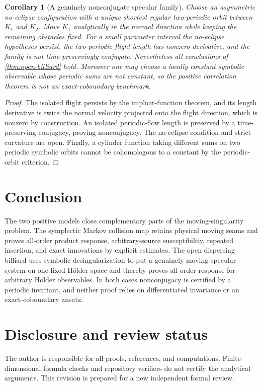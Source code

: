 \documentclass[11pt,reqno]{amsart}
\newtheorem{corollary}[theorem]{Corollary}
\theoremstyle{definition}
\theoremstyle{remark}
\begin{document}
\begin{corollary}[A genuinely nonconjugate specular family]\label{cor:specular}
Choose an asymmetric no-eclipse configuration with a unique shortest regular
two-periodic orbit between $K_1$ and $K_2$.  Move $K_1$ analytically in the
normal direction while keeping the remaining obstacles fixed.  For a small
parameter interval the no-eclipse hypotheses persist, the two-periodic flight
length has nonzero derivative, and the family is not time-preservingly
conjugate.  Nevertheless all conclusions of \cref{thm:open-billiard} hold.
Moreover one may choose a locally constant symbolic observable whose periodic
sums are not constant, so the positive correlation theorem is not an
exact-coboundary benchmark.
\end{corollary}

\begin{proof}
The isolated flight persists by the implicit-function theorem, and its length
derivative is twice the normal velocity projected onto the flight direction,
which is nonzero by construction.  An isolated periodic-flow length is
preserved by a time-preserving conjugacy, proving nonconjugacy.  The no-eclipse
condition and strict curvature are open.  Finally, a cylinder function taking
different sums on two periodic symbolic orbits cannot be cohomologous to a
constant by the periodic-orbit criterion.
\end{proof}

\section{Conclusion}

The two positive models close complementary parts of the moving-singularity
problem.  The symplectic Markov collision map retains physical moving seams and
proves all-order product response, arbitrary-source susceptibility, repeated
insertion, and exact innovations by explicit estimates.  The open dispersing
billiard uses symbolic desingularization to put a genuinely moving specular
system on one fixed Hölder space and thereby proves all-order response for
arbitrary Hölder observables.  In both cases nonconjugacy is certified by a
periodic invariant, and neither proof relies on differentiated invariance or
an exact-coboundary ansatz.

\section*{Disclosure and review status}
The author is responsible for all proofs, references, and computations.
Finite-dimensional formula checks and repository verifiers do not certify the
analytical arguments.  This revision is prepared for a new independent formal
review.



\end{document}
